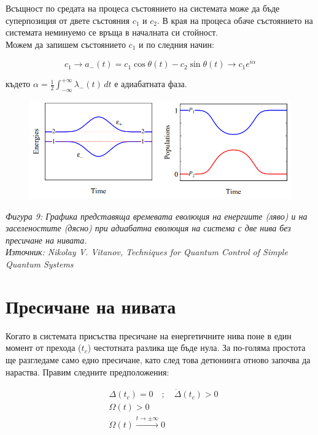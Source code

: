     Всъщност по средата на процеса състоянието на системата може да бъде суперпозиция от двете състояния $c_1$ и $c_2$. В края на процеса обаче състоянието
    на системата неминуемо се връща в началната си стойност.\\
    Можем да запишем състоянието $c_1$ и по следния начин:

    \begin{equation}
        c_1 \rightarrow a_-(t) = c_1 \cos\theta(t) - c_2 \sin\theta(t) \rightarrow c_1 e^{i\alpha}
    \end{equation}

    където $\alpha = \frac{1}{2}\int_{-\infty}^{+\infty} \lambda_-(t) \,dt$ е адиабатната фаза.

    \begin{figure}[H]
        \centering
        \includegraphics[width=370pt]{4.png}
    \end{figure}
    \begin{center}
        \small \textit{Фигура 9: Графика представяща времевата еволюция на енергиите (ляво) и на заселеностите (дясно) при адиабатна еволюция на система с две нива без пресичане на нивата.\\
        Източник: Nikolay V. Vitanov, Techniques for Quantum Control of Simple Quantum Systems \cite{sussex_vitanov}}
    \end{center}

    \section{Пресичане на нивата}

    Когато в системата присъства пресичане на енергетичните нива поне в един момент от прехода ($t_c$) честотната разлика ще бъде нула. За по-голяма простота ще разгледаме само едно
    пресичане, като след това детюнинга отново започва да нараства. Правим следните предположения:

    \begin{align}
        & \Delta (t_c) = 0 \quad ; \quad \dot{\Delta}(t_c) > 0\\
        & \Omega (t) > 0 \\
        & \Omega (t) \xrightarrow[]{t\rightarrow \pm \infty} 0
    \end{align}

